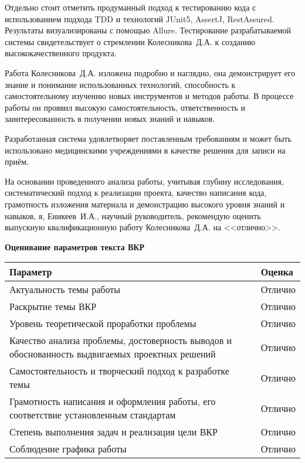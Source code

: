 \documentclass[a4paper,article]{article}
\begin{document}
\begin{sloppypar}
    Отдельно стоит отметить продуманный подход к тестированию кода с использованием подхода TDD и технологий JUnit5, AssertJ, RestAssured. Результаты визуализированы с помощью Allure. Тестирование разрабатываемой системы свидетельствует о стремлении Колесникова~Д.А. к созданию высококачественного продукта.
    
    Работа Колесникова~Д.А. изложена подробно и наглядно, она демонстрирует его знание и понимание использованных технологий, способность к самостоятельному изучению новых инструментов и методов работы. В процессе работы он проявил высокую самостоятельность, ответственность и заинтересованность в получении новых знаний и навыков.
    
    Разработанная система удовлетворяет поставленным требованиям и может быть использовано медицинскими учреждениями в качестве решения для записи на приём.
    
    На основании проведенного анализа работы, учитывая глубину исследования, систематический подход к реализации проекта, качество написания кода, грамотность изложения материала и демонстрацию высокого уровня знаний и навыков, я, Еникеев~И.А., научный руководитель, рекомендую оценить выпускную квалификационную работу Колесникова~Д.А. на <<отлично>>. \newline
    
    \textbf{Оценивание параметров текста ВКР}

    \begin{xltabular}{\textwidth} { |
            >{\hsize} X |
            >{\hsize} X | }

        \hline
        \textbf{Параметр} 
        & \textbf{Оценка} \\
        \hline
        Актуальность темы работы
        & Отлично \\
        \hline
        Раскрытие темы ВКР
        & Отлично \\
        \hline
        Уровень теоретической проработки проблемы
        & Отлично \\
        \hline
        Качество анализа проблемы, достоверность выводов и обоснованность выдвигаемых проектных решений
        & Отлично \\
        \hline
        Самостоятельность и творческий подход к разработке темы
        & Отлично \\
        \hline
        Грамотность написания и оформления работы, его соответствие установленным стандартам
        & Отлично \\
        \hline
        Степень выполнения задач и реализация цели ВКР
        & Отлично \\
        \hline
        Соблюдение графика работы
        & Отлично \\
        \hline
    \end{xltabular}


\end{sloppypar}
\end{document}

